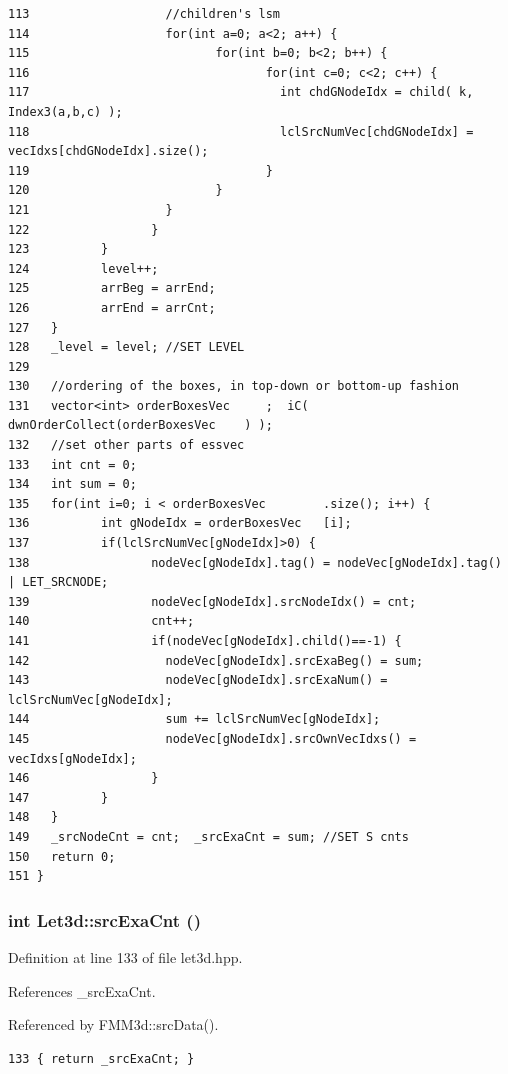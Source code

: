 \begin{verbatim}
113                   //children's lsm                
114                   for(int a=0; a<2; a++) {
115                          for(int b=0; b<2; b++) {
116                                 for(int c=0; c<2; c++) {
117                                   int chdGNodeIdx = child( k, Index3(a,b,c) );
118                                   lclSrcNumVec[chdGNodeIdx] = vecIdxs[chdGNodeIdx].size();
119                                 }
120                          }
121                   }
122                 }
123          }
124          level++;
125          arrBeg = arrEnd;
126          arrEnd = arrCnt;
127   }
128   _level = level; //SET LEVEL
129 
130   //ordering of the boxes, in top-down or bottom-up fashion
131   vector<int> orderBoxesVec     ;  iC( dwnOrderCollect(orderBoxesVec    ) );
132   //set other parts of essvec
133   int cnt = 0;
134   int sum = 0;
135   for(int i=0; i < orderBoxesVec        .size(); i++) {
136          int gNodeIdx = orderBoxesVec   [i];
137          if(lclSrcNumVec[gNodeIdx]>0) {
138                 nodeVec[gNodeIdx].tag() = nodeVec[gNodeIdx].tag() | LET_SRCNODE;
139                 nodeVec[gNodeIdx].srcNodeIdx() = cnt;
140                 cnt++;
141                 if(nodeVec[gNodeIdx].child()==-1) {
142                   nodeVec[gNodeIdx].srcExaBeg() = sum;
143                   nodeVec[gNodeIdx].srcExaNum() = lclSrcNumVec[gNodeIdx];
144                   sum += lclSrcNumVec[gNodeIdx];
145                   nodeVec[gNodeIdx].srcOwnVecIdxs() = vecIdxs[gNodeIdx];
146                 }
147          }
148   }
149   _srcNodeCnt = cnt;  _srcExaCnt = sum; //SET S cnts
150   return 0;
151 }
\end{verbatim}\normalsize 


\subsubsection{\setlength{\rightskip}{0pt plus 5cm}int Let3d::src\-Exa\-Cnt ()\hspace{0.3cm}{\tt  [inline]}}\label{classLet3d_634dbea010c08e20a4029d6c0c4550e3_634dbea010c08e20a4029d6c0c4550e3}




Definition at line 133 of file let3d.hpp.

References \_\-src\-Exa\-Cnt.

Referenced by FMM3d::src\-Data().

\footnotesize\begin{verbatim}133 { return _srcExaCnt; }
\end{verbatim}\normalsize 


